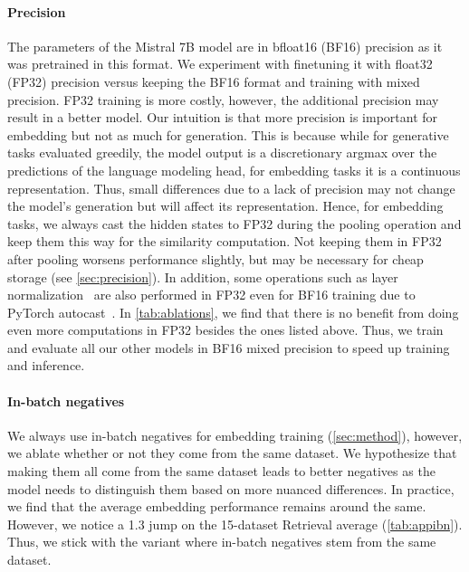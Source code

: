 \documentclass{article}
\begin{document}
\paragraph{Precision} The parameters of the Mistral 7B model are in bfloat16 (BF16) precision as it was pretrained in this format. We experiment with finetuning it with float32 (FP32) precision versus keeping the BF16 format and training with mixed precision. FP32 training is more costly, however, the additional precision may result in a better model. Our intuition is that more precision is important for embedding but not as much for generation. This is because while for generative tasks evaluated greedily, the model output is a discretionary argmax over the predictions of the language modeling head, for embedding tasks it is a continuous representation. Thus, small differences due to a lack of precision may not change the model's generation but will affect its representation. Hence, for embedding tasks, we always cast the hidden states to FP32 during the pooling operation and keep them this way for the similarity computation. Not keeping them in FP32 after pooling worsens performance slightly, but may be necessary for cheap storage (see \autoref{sec:precision}). In addition, some operations such as layer normalization~\cite{ba2016layer} are also performed in FP32 even for BF16 training due to PyTorch autocast~\cite{zhao2023pytorch}. In \autoref{tab:ablations}, we find that there is no benefit from doing even more computations in FP32 besides the ones listed above. Thus, we train and evaluate all our other models in BF16 mixed precision to speed up training and inference.

\paragraph{In-batch negatives} We always use in-batch negatives for embedding training (\autoref{sec:method}), however, we ablate whether or not they come from the same dataset. We hypothesize that making them all come from the same dataset leads to better negatives as the model needs to distinguish them based on more nuanced differences. In practice, we find that the average embedding performance remains around the same. However, we notice a 1.3 jump on the 15-dataset Retrieval average (\autoref{tab:appibn}). Thus, we stick with the variant where in-batch negatives stem from the same dataset.
\end{document}
